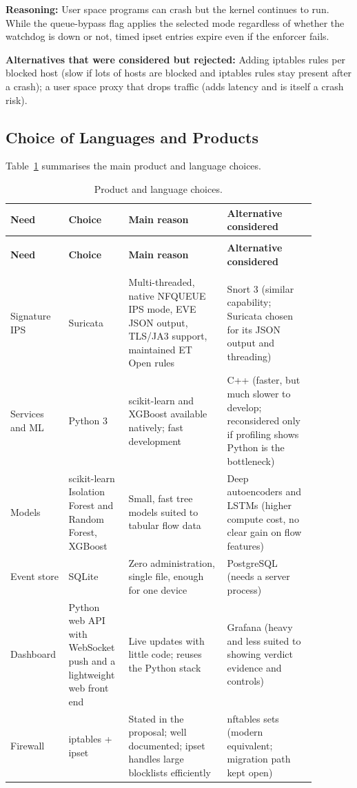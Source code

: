 \noindent \textbf{Reasoning:} User space programs can crash but the kernel continues to run. While the queue-bypass flag applies the selected mode regardless of whether the watchdog is down or not, timed ipset entries expire even if the enforcer fails.

\noindent \textbf{Alternatives that were considered but rejected:} Adding iptables rules per blocked host (slow if lots of hosts are blocked and iptables rules stay present after a crash); a user space proxy that drops traffic (adds latency and is itself a crash risk).

\subsection{Choice of Languages and Products}\label{sec:6.4.6}
\noindent Table~\ref{tab:products} summarises the main product and language choices.

\begin{longtable}{|>{\raggedright\arraybackslash}p{0.13\linewidth}|>{\raggedright\arraybackslash}p{0.18\linewidth}|>{\raggedright\arraybackslash}p{0.3\linewidth}|>{\raggedright\arraybackslash}p{0.27\linewidth}|}
\caption{Product and language choices.}
\label{tab:products} \\
\hline
\textbf{Need} & \textbf{Choice} & \textbf{Main reason} & \textbf{Alternative considered} \\
\hline
\endfirsthead
\multicolumn{4}{l}{\tablename\ \thetable{} -- continued from previous page} \\
\hline
\textbf{Need} & \textbf{Choice} & \textbf{Main reason} & \textbf{Alternative considered} \\
\hline
\endhead
\hline
\multicolumn{4}{r}{Continued on next page} \\
\endfoot
\hline
\endlastfoot
Signature IPS & Suricata & Multi-threaded, native NFQUEUE IPS mode, EVE JSON output, TLS/JA3 support, maintained ET Open rules & Snort 3 (similar capability; Suricata chosen for its JSON output and threading) \\
\hline
Services and ML & Python 3 & scikit-learn and XGBoost available natively; fast development & C++ (faster, but much slower to develop; reconsidered only if profiling shows Python is the bottleneck) \\
\hline
Models & scikit-learn Isolation Forest and Random Forest, XGBoost & Small, fast tree models suited to tabular flow data & Deep autoencoders and LSTMs (higher compute cost, no clear gain on flow features) \\
\hline
Event store & SQLite & Zero administration, single file, enough for one device & PostgreSQL (needs a server process) \\
\hline
Dashboard & Python web API with WebSocket push and a lightweight web front end & Live updates with little code; reuses the Python stack & Grafana (heavy and less suited to showing verdict evidence and controls) \\
\hline
Firewall & iptables + ipset & Stated in the proposal; well documented; ipset handles large blocklists efficiently & nftables sets (modern equivalent; migration path kept open) \\
\hline
\end{longtable}

